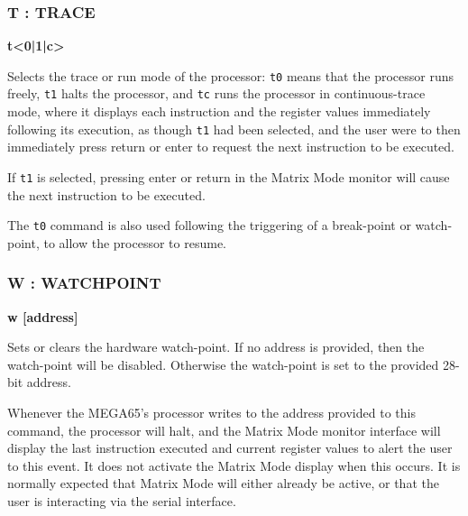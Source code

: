 \subsubsection{T : TRACE}
\begin{description}[leftmargin=2cm,style=nextline]
\item [Format:] {\bf t<0|1|c>}
\item [Usage:] Selects the trace or run mode of the processor: {\tt t0} means that the
  processor runs freely, {\tt t1} halts the processor, and {\tt tc} runs the processor
  in continuous-trace mode, where it displays each instruction and the register values
  immediately following its execution, as though {\tt t1} had been selected, and the user
  were to then immediately press return or enter to request the next instruction to be
  executed.

  If {\tt t1} is selected, pressing enter or return in the Matrix Mode monitor will cause
  the next instruction to be executed.

  The {\tt t0} command is also used following the triggering of a break-point or watch-point,
  to allow the processor to resume.

\end{description}

\subsubsection{W : WATCHPOINT}
\begin{description}[leftmargin=2cm,style=nextline]
\item [Format:] {\bf w [address]}
\item [Usage:] Sets or clears the hardware watch-point. If no address is provided,
  then the watch-point will be disabled. Otherwise the watch-point is set to the
  provided 28-bit address.

  Whenever the MEGA65's processor writes to the address
  provided to this command, the processor will halt, and the Matrix Mode monitor interface
  will display the last instruction executed and current register values to alert the user
  to this event.  It does not activate the Matrix Mode display when this occurs.
  It is
  normally expected that Matrix Mode will either already be active, or that the user is
  interacting via the serial interface.

\end{description}

